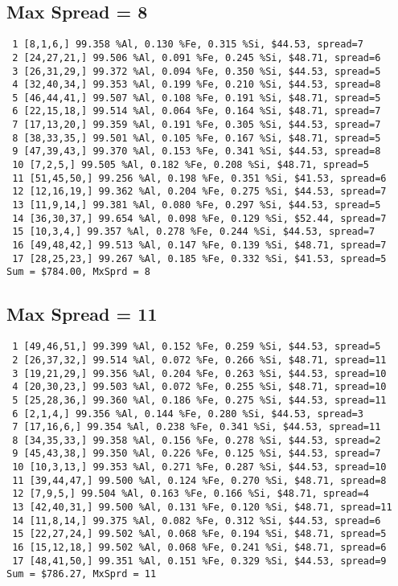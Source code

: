 \documentclass{article}
\begin{document}
\subsection{Max Spread = 8}
\begin{verbatim}
 1 [8,1,6,] 99.358 %Al, 0.130 %Fe, 0.315 %Si, $44.53, spread=7
 2 [24,27,21,] 99.506 %Al, 0.091 %Fe, 0.245 %Si, $48.71, spread=6
 3 [26,31,29,] 99.372 %Al, 0.094 %Fe, 0.350 %Si, $44.53, spread=5
 4 [32,40,34,] 99.353 %Al, 0.199 %Fe, 0.210 %Si, $44.53, spread=8
 5 [46,44,41,] 99.507 %Al, 0.108 %Fe, 0.191 %Si, $48.71, spread=5
 6 [22,15,18,] 99.514 %Al, 0.064 %Fe, 0.164 %Si, $48.71, spread=7
 7 [17,13,20,] 99.359 %Al, 0.191 %Fe, 0.305 %Si, $44.53, spread=7
 8 [38,33,35,] 99.501 %Al, 0.105 %Fe, 0.167 %Si, $48.71, spread=5
 9 [47,39,43,] 99.370 %Al, 0.153 %Fe, 0.341 %Si, $44.53, spread=8
 10 [7,2,5,] 99.505 %Al, 0.182 %Fe, 0.208 %Si, $48.71, spread=5
 11 [51,45,50,] 99.256 %Al, 0.198 %Fe, 0.351 %Si, $41.53, spread=6
 12 [12,16,19,] 99.362 %Al, 0.204 %Fe, 0.275 %Si, $44.53, spread=7
 13 [11,9,14,] 99.381 %Al, 0.080 %Fe, 0.297 %Si, $44.53, spread=5
 14 [36,30,37,] 99.654 %Al, 0.098 %Fe, 0.129 %Si, $52.44, spread=7
 15 [10,3,4,] 99.357 %Al, 0.278 %Fe, 0.244 %Si, $44.53, spread=7
 16 [49,48,42,] 99.513 %Al, 0.147 %Fe, 0.139 %Si, $48.71, spread=7
 17 [28,25,23,] 99.267 %Al, 0.185 %Fe, 0.332 %Si, $41.53, spread=5
Sum = $784.00, MxSprd = 8      
\end{verbatim}
\subsection{Max Spread = 11}
\begin{verbatim}
 1 [49,46,51,] 99.399 %Al, 0.152 %Fe, 0.259 %Si, $44.53, spread=5
 2 [26,37,32,] 99.514 %Al, 0.072 %Fe, 0.266 %Si, $48.71, spread=11
 3 [19,21,29,] 99.356 %Al, 0.204 %Fe, 0.263 %Si, $44.53, spread=10
 4 [20,30,23,] 99.503 %Al, 0.072 %Fe, 0.255 %Si, $48.71, spread=10
 5 [25,28,36,] 99.360 %Al, 0.186 %Fe, 0.275 %Si, $44.53, spread=11
 6 [2,1,4,] 99.356 %Al, 0.144 %Fe, 0.280 %Si, $44.53, spread=3
 7 [17,16,6,] 99.354 %Al, 0.238 %Fe, 0.341 %Si, $44.53, spread=11
 8 [34,35,33,] 99.358 %Al, 0.156 %Fe, 0.278 %Si, $44.53, spread=2
 9 [45,43,38,] 99.350 %Al, 0.226 %Fe, 0.125 %Si, $44.53, spread=7
 10 [10,3,13,] 99.353 %Al, 0.271 %Fe, 0.287 %Si, $44.53, spread=10
 11 [39,44,47,] 99.500 %Al, 0.124 %Fe, 0.270 %Si, $48.71, spread=8
 12 [7,9,5,] 99.504 %Al, 0.163 %Fe, 0.166 %Si, $48.71, spread=4
 13 [42,40,31,] 99.500 %Al, 0.131 %Fe, 0.120 %Si, $48.71, spread=11
 14 [11,8,14,] 99.375 %Al, 0.082 %Fe, 0.312 %Si, $44.53, spread=6
 15 [22,27,24,] 99.502 %Al, 0.068 %Fe, 0.194 %Si, $48.71, spread=5
 16 [15,12,18,] 99.502 %Al, 0.068 %Fe, 0.241 %Si, $48.71, spread=6
 17 [48,41,50,] 99.351 %Al, 0.151 %Fe, 0.329 %Si, $44.53, spread=9
Sum = $786.27, MxSprd = 11                                                                                                                                                                                                                                           
\end{verbatim}
\end{document}
